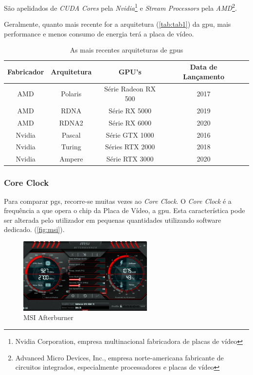 \documentclass{report}
\begin{document}
São apelidados de \textit{CUDA Cores} pela \textit{Nvidia}\footnote{Nvidia Corporation, empresa multinacional fabricadora de placas de vídeo} e \textit{Stream Processors} pela \textit{AMD}\footnote{Advanced Micro Devices, Inc., empresa norte-americana fabricante de circuitos integrados, especialmente processadores e placas de vídeo}. 

Geralmente, quanto mais recente for a arquitetura (\autoref{tab:tab1}) da \ac{gpu}, mais performance e menos consumo de energia terá a placa de vídeo\cite{graphh}.

\begin{table}[h]
\begin{center}
\begin{tabular}{|c|c|c|c|l}
 \hline
 Fabricador & Arquitetura & GPU's & Data de Lançamento \\ [0.5ex] 
 \hline\hline
 AMD & Polaris & Série Radeon RX 500 & 2017\\ 
 \hline
 AMD & RDNA & Série RX 5000 &  2019\\
 \hline
 AMD & RDNA2 & Série RX 6000 & 2020\\
 \hline
 Nvidia & Pascal & Série GTX 1000 & 2016\\
 \hline
 Nvidia & Turing & Séries RTX 2000 & 2018\\ 
 \hline
 Nvidia & Ampere & Série RTX 3000 & 2020\\ [1ex] 
 \hline
\end{tabular}
\end{center}
\caption{As mais recentes arquiteturas de \acp{gpu}\label{tab:tab1}}
\end{table}
\clearpage
\subsubsection{Core Clock}

Para comparar \acp{pg}, recorre-se muitas vezes ao \textit{Core Clock}. O \textit{Core Clock} é a frequência a que opera o chip da Placa de Vídeo, a \ac{gpu}. Esta característica pode ser alterada pelo utilizador em pequenas quantidades utilizando software dedicado. (\autoref{fig:msi}).

\begin{figure}[h]
\centering
\includegraphics[width=0.6\textwidth]{msiafterburner.jpg}
\caption{MSI Afterburner}
\label{fig:msi}
\end{figure}
\end{document}
